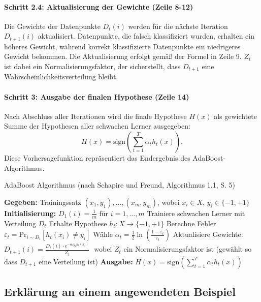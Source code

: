 \paragraph{Schritt 2.4: Aktualisierung der Gewichte (Zeile 8-12)}
Die Gewichte der Datenpunkte \( D_t(i) \) werden für die nächste Iteration \( D_{t+1}(i) \) aktualisiert. Datenpunkte, die falsch klassifiziert wurden, erhalten ein höheres Gewicht, während korrekt klassifizierte Datenpunkte ein niedrigeres Gewicht bekommen. Die Aktualisierung erfolgt gemäß der Formel in Zeile 9. \( Z_t \) ist dabei ein Normalisierungsfaktor, der sicherstellt, dass \( D_{t+1} \) eine Wahrscheinlichkeitsverteilung bleibt.

\paragraph{Schritt 3: Ausgabe der finalen Hypothese (Zeile 14)}
Nach Abschluss aller Iterationen wird die finale Hypothese \( H(x) \) als gewichtete Summe der Hypothesen aller schwachen Lerner ausgegeben:
\[
H(x) = \text{sign}\left(\sum_{t=1}^{T} \alpha_t h_t(x)\right).
\]
Diese Vorhersagefunktion repräsentiert das Endergebnis des AdaBoost-Algorithmus.

\begin{algorithm}[H]
    \caption{AdaBoost Algorithmus (nach Schapire und Freund, Algorithmus 1.1, S. 5)}\label{fig:adaboost}
    \begin{algorithmic}[1]
    \State \textbf{Gegeben:} Trainingssatz \( (x_1,y_1), \dots, (x_m,y_m) \), wobei \( x_i \in X \), \( y_i \in \{-1, +1\} \)
    \State \textbf{Initialisierung:} \( D_1(i) = \frac{1}{m} \) für \( i = 1, \dots, m \)
        \State Trainiere schwachen Lerner mit Verteilung \( D_t \)
        \State Erhalte Hypothese \( h_t : X \rightarrow \{-1, +1\} \)
        \State Berechne Fehler \( \varepsilon_t = \text{Pr}_{i \sim D_t} [h_t(x_i) \neq y_i] \)
        \State Wähle \( \alpha_t = \frac{1}{2} \ln\left(\frac{1 - \varepsilon_t}{\varepsilon_t}\right) \)
        \State Aktualisiere Gewichte: 
            \State \hfill \( D_{t+1}(i) = \frac{D_t(i) \cdot e^{-\alpha_t y_i h_t(x_i)}}{Z_t} \) \hfill\(\) %
        \EndFor
        \State wobei \( Z_t \) ein Normalisierungsfaktor ist (gewählt so dass \( D_{t+1} \) eine Verteilung ist)
    \EndFor
    \State \textbf{Ausgabe:} \( H(x) = \text{sign}\left(\sum_{t=1}^{T} \alpha_t h_t(x)\right) \)
    \end{algorithmic}
\end{algorithm}

\subsection{Erklärung an einem angewendeten Beispiel}
